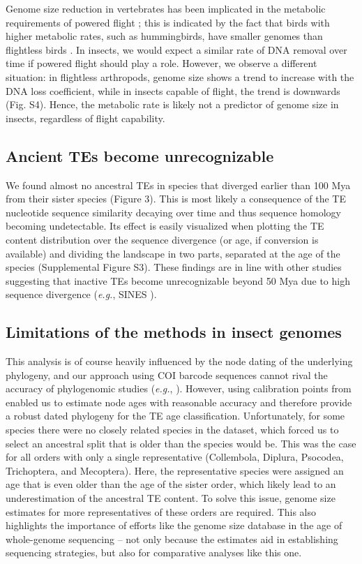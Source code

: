 Genome size reduction in vertebrates has been implicated in the
metabolic requirements of powered flight \citep{Wright2014}; this is
indicated by the fact that birds with higher metabolic rates, such as
hummingbirds, have smaller genomes than flightless birds
\citep{Gregory2005}. In insects, we would expect a similar rate of DNA
removal over time if powered flight should play a role. However, we
observe a different situation: in flightless arthropods, genome size
shows a trend to increase with the DNA loss coefficient, while in
insects capable of flight, the trend is downwards (Fig. S4). Hence, the
metabolic rate is likely not a predictor of genome size in insects,
regardless of flight capability.

\subsection{Ancient TEs become
unrecognizable}\label{ancient-tes-become-unrecognizable}

We found almost no ancestral TEs in species that diverged earlier than
100 Mya from their sister species (Figure 3). This is most likely a
consequence of the TE nucleotide sequence similarity decaying over time
and thus sequence homology becoming undetectable. Its effect is easily
visualized when plotting the TE content distribution over the sequence
divergence (or age, if conversion is available) and dividing the
landscape in two parts, separated at the age of the species
(Supplemental Figure S3). These findings are in line with other studies
suggesting that inactive TEs become unrecognizable beyond 50 Mya due to
high sequence divergence (\emph{e.g.}, SINES \citep{Shedlock2000}).

\subsection{Limitations of the methods in insect
genomes}\label{limitations-of-the-methods-in-insect-genomes}

This analysis is of course heavily influenced by the node dating of the
underlying phylogeny, and our approach using COI barcode sequences
cannot rival the accuracy of phylogenomic studies (\emph{e.g.},
\citep{Misof2014}). However, using calibration points from
\citep{Misof2014} enabled us to estimate node ages with reasonable
accuracy and therefore provide a robust dated phylogeny for the TE age
classification. Unfortunately, for some species there were no closely
related species in the dataset, which forced us to select an ancestral
split that is older than the species would be. This was the case for all
orders with only a single representative (Collembola, Diplura, Psocodea,
Trichoptera, and Mecoptera). Here, the representative species were
assigned an age that is even older than the age of the sister order,
which likely lead to an underestimation of the ancestral TE content. To
solve this issue, genome size estimates for more representatives of
these orders are required. This also highlights the importance of
efforts like the genome size database \citep{Gregory2018} in the age of
whole-genome sequencing -- not only because the estimates aid in
establishing sequencing strategies, but also for comparative analyses
like this one.

